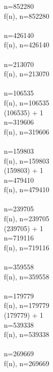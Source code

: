 \documentclass{article}
\begin{document}
 \Rightarrow n=852280
 \\[3mm] 
f(n), n=852280
 \\ 
 \Rightarrow {} 
 \\ 
 \Rightarrow n=426140
 \\[3mm] 
f(n), n=426140
 \\ 
 \Rightarrow {} 
 \\ 
 \Rightarrow n=213070
 \\[3mm] 
f(n), n=213070
 \\ 
 \Rightarrow {} 
 \\ 
 \Rightarrow n=106535
 \\[3mm] 
f(n), n=106535
 \\ 
 (106535) + 1
 \\ 
 \Rightarrow n=319606
 \\[3mm] 
f(n), n=319606
 \\ 
 \Rightarrow {} 
 \\ 
 \Rightarrow n=159803
 \\[3mm] 
f(n), n=159803
 \\ 
 (159803) + 1
 \\ 
 \Rightarrow n=479410
 \\[3mm] 
f(n), n=479410
 \\ 
 \Rightarrow {} 
 \\ 
 \Rightarrow n=239705
 \\[3mm] 
f(n), n=239705
 \\ 
 (239705) + 1
 \\ 
 \Rightarrow n=719116
 \\[3mm] 
f(n), n=719116
 \\ 
 \Rightarrow {} 
 \\ 
 \Rightarrow n=359558
 \\[3mm] 
f(n), n=359558
 \\ 
 \Rightarrow {} 
 \\ 
 \Rightarrow n=179779
 \\[3mm] 
f(n), n=179779
 \\ 
 (179779) + 1
 \\ 
 \Rightarrow n=539338
 \\[3mm] 
f(n), n=539338
 \\ 
 \Rightarrow {} 
 \\ 
 \Rightarrow n=269669
 \\[3mm] 
f(n), n=269669
 \\ 
\end{document}
